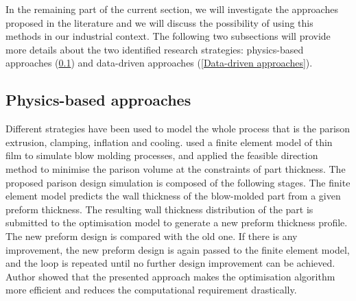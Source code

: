 In the remaining part of the current section, we will investigate the approaches proposed in the literature and we will discuss the possibility of using this methods in our industrial context. The following two subsections will provide more details about the two identified research strategies: physics-based approaches (\ref{Physics-based approaches}) and data-driven approaches (\ref{Data-driven approaches}). 

\subsection{Physics-based approaches} \label{Physics-based approaches}

Different strategies have been used to model the whole process that is the parison extrusion, clamping, inflation and cooling. \citep{lee1996prediction} used a finite element model of thin film to simulate blow molding processes, and applied the feasible direction method to minimise the parison volume at the constraints of part thickness. The proposed parison design simulation is composed of the following stages. The finite element model predicts the wall thickness of the blow-molded part from a given preform thickness. The resulting wall thickness distribution of the part is submitted to the optimisation model to generate a new preform thickness profile. The new preform design is compared with the old one. If there is any improvement, the new preform design is again passed to the finite element model, and the loop is repeated until no further design improvement can be achieved. Author showed that the presented approach makes the optimisation algorithm more efficient and reduces the computational requirement drastically. 

